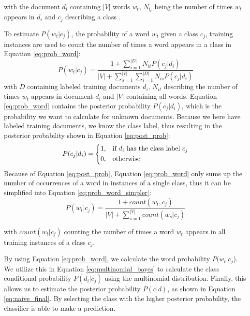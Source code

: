         with the document $d_i$ containing $|V|$ words $w_t$, $N_{i_t}$ being the number of times $w_t$ appears in $d_i$ and $c_j$ describing a class \cite{Mccallum1998}. 
        
        To estimate $P(w_t|c_j)$, the probability of a word $w_t$ given a class $c_j$, training instances are used to count the number of times a word appears in a class in Equation \eqref{eq:prob_word}:
        \begin{equation}
            \label{eq:prob_word}
                P(w_t|c_j) = \frac{1 + \sum_{i=1}^{|D|}N_{it} P(c_j|d_i)}{|V| + \sum_{s=1}^{|V|} \sum_{i=1}^{|D|}N_{is} P (c_j|d_i)} 
        \end{equation}
        with $D$ containing labeled training documents $d_i$, $N_{it}$ describing the number of times $w_t$ appears in document $d_i$ and $|V|$ containing all words.
        Equation \eqref{eq:prob_word} contains the posterior probability $P(c_j|d_i)$, which is the probability we want to calculate for unknown documents. Because we here have labeled training documents, we know the class label, thus resulting in the posterior probability shown in Equation \eqref{eq:post_prob}:
        \begin{equation}
                \label{eq:post_prob}
                P(c_j|d_i)= 
                \begin{dcases}
                1,& \text{if } d_i \text{ has the class label } c_j \\
                0,              & \text{otherwise}
        \end{dcases}
        \end{equation}
        Because of Equation \eqref{eq:post_prob}, Equation \eqref{eq:prob_word} only sums up the number of occurrences of a word in instances of a single class, thus it can be simplified into Equation \eqref{eq:prob_word_simpler}:
                \begin{equation}
            \label{eq:prob_word_simpler}
                P(w_t|c_j) = \frac{1 + count(w_t, c_j)}{|V| + \sum_{s=1}^{|V|}count(w_s|c_j)} 
        \end{equation}

        with $count(w_t|c_j)$ counting the number of times a word $w_t$ appears in all training instances of a class $c_j$.
        
        By using Equation \eqref{eq:prob_word}, we calculate the word probability $P(w_t|c_j$). We utilize this in Equation \eqref{eq:multinomial_bayes} to calculate the class conditional probability $P(d_i|c_j)$ using the multinomial distribution. Finally, this allows us to estimate the posterior probability $P(c|d)$, as shown in Equation \eqref{eq:naive_final}. By selecting the class with the higher posterior probability, the classifier is able to make a prediction.
        
